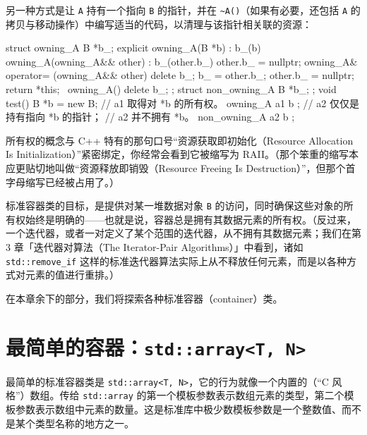 另一种方式是让 \texttt{A} 持有一个指向 \texttt{B} 的指针，并在 \texttt{\textasciitilde A(\allowbreak{})\allowbreak{}}（如果有必要，还包括 \texttt{A} 的拷贝与移动操作）中编写适当的代码，以清理与该指针相关联的资源：

\begin{codebox}[cpp]
    struct owning_A {
      B *b_;
      explicit owning_A(B *b) : b_(b) {}
      owning_A(owning_A&& other) : b_(other.b_) {
        other.b_ = nullptr;
      }
      owning_A& operator= (owning_A&& other) {
        delete b_;
        b_ = other.b_;
        other.b_ = nullptr;
        return *this;
      }
      ~owning_A() {
        delete b_;
      }
    };
    struct non_owning_A {
      B *b_;
    };
    void test()
    {
      B *b = new B;
      // a1 取得对 *b 的所有权。
      owning_A a1 { b };
      // a2 仅仅是持有指向 *b 的指针；
      // a2 并不拥有 *b。
      non_owning_A a2 { b };
    }
\end{codebox}

所有权的概念与 C++ 特有的那句口号“资源获取即初始化（Resource Allocation Is Initialization）”紧密绑定，你经常会看到它被缩写为 RAII。（那个笨重的缩写本应更贴切地叫做“资源释放即销毁（Resource Freeing Is Destruction）”，但那个首字母缩写已经被占用了。）

标准容器类的目标，是提供对某一堆数据对象 \texttt{B} 的访问，同时确保这些对象的所有权始终是明确的——也就是说，容器总是拥有其数据元素的所有权。（反过来，一个迭代器，或者一对定义了某个范围的迭代器，从不拥有其数据元素；我们在第 3 章「迭代器对算法（The Iterator-Pair Algorithms）」中看到，诸如 \texttt{std::\allowbreak{}remove\_\allowbreak{}if} 这样的标准迭代器算法实际上从不释放任何元素，而是以各种方式对元素的值进行重排。）

在本章余下的部分，我们将探索各种标准容器（container）类。

\section{最简单的容器：\texttt{std::\allowbreak{}array<\allowbreak{}T,\allowbreak{} N>\allowbreak{}}}

最简单的标准容器类是 \texttt{std::\allowbreak{}array<\allowbreak{}T,\allowbreak{} N>\allowbreak{}}，它的行为就像一个内置的（“C 风格”）数组。传给 \texttt{std::\allowbreak{}array} 的第一个模板参数表示数组元素的类型，第二个模板参数表示数组中元素的数量。这是标准库中极少数模板参数是一个整数值、而不是某个类型名称的地方之一。



